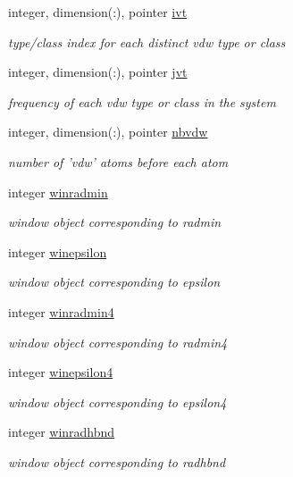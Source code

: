 \begin{DoxyCompactItemize}
integer, dimension(\-:), pointer \hyperlink{classvdw_a7820644a836b2f500bd9ca9a209b8618}{ivt}
\begin{DoxyCompactList}\small\item\em type/class index for each distinct vdw type or class \end{DoxyCompactList}\item 
integer, dimension(\-:), pointer \hyperlink{classvdw_a6ea1e02bcc0603c5869ca4da25ddc75c}{jvt}
\begin{DoxyCompactList}\small\item\em frequency of each vdw type or class in the system \end{DoxyCompactList}\item 
integer, dimension(\-:), pointer \hyperlink{classvdw_a1682072bec44b47fdbeb05fe438b1167}{nbvdw}
\begin{DoxyCompactList}\small\item\em number of 'vdw' atoms before each atom \end{DoxyCompactList}\item 
integer \hyperlink{classvdw_a4dc5326b78b01b48d1ed5a4ae869faa0}{winradmin}
\begin{DoxyCompactList}\small\item\em window object corresponding to radmin \end{DoxyCompactList}\item 
integer \hyperlink{classvdw_af61591d1fb9c9a51bc99f386b70d5aa3}{winepsilon}
\begin{DoxyCompactList}\small\item\em window object corresponding to epsilon \end{DoxyCompactList}\item 
integer \hyperlink{classvdw_a5d28e96374dca3938469367477be14ab}{winradmin4}
\begin{DoxyCompactList}\small\item\em window object corresponding to radmin4 \end{DoxyCompactList}\item 
integer \hyperlink{classvdw_aa83424a9fd661a24af2a7f3398752043}{winepsilon4}
\begin{DoxyCompactList}\small\item\em window object corresponding to epsilon4 \end{DoxyCompactList}\item 
integer \hyperlink{classvdw_a489e8cba15f756d8ca2a9543e253fab8}{winradhbnd}
\begin{DoxyCompactList}\small\item\em window object corresponding to radhbnd \end{DoxyCompactList}\item 

\end{DoxyCompactItemize}

